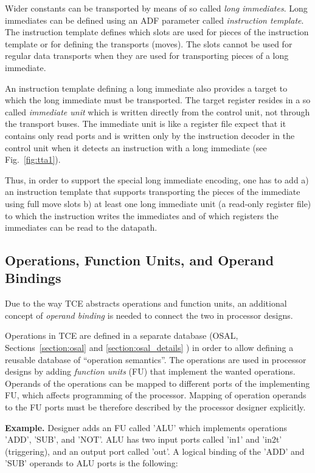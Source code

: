 \documentclass[twoside]{tceusermanual}
\begin{document}
Wider constants can be transported by means of so called \textit{long
  immediates}. Long immediates can be defined using an ADF parameter
called \textit{instruction template}. The instruction template defines
which slots are used for pieces of the instruction template or for
defining the transports (moves).  The slots cannot be used for regular
data transports when they are used for transporting pieces of a long
immediate.

An instruction template defining a long immediate also provides
a target to which the long immediate must be transported. The target register
resides in a so called \textit{immediate unit} which is written directly 
from the control unit, not through the transport buses. The immediate unit is like
a register file expect that it contains only read ports and is written
only by the instruction decoder in the control unit when it detects an 
instruction with a long immediate (see Fig.~\ref{fig:tta1}).

Thus, in order to support the special long immediate encoding, one has
to add a) an instruction template that supports transporting the pieces
of the immediate using full move slots b) at least one long immediate
unit (a read-only register file) to which the instruction writes the
immediates and of which registers the immediates can be read to the
datapath.

\subsection{Operations, Function Units, and Operand Bindings}
Due to the way TCE abstracts operations and function units, an
additional concept of \textit{operand binding} is needed to 
connect the two in processor designs.

Operations in TCE are defined in a separate database (OSAL,
Sections~\ref{section:osal} and \ref{section:osal_details} ) in order
to allow defining a reusable database of ``operation semantics''. The
operations are used in processor designs by adding \textit{function
units} (FU) that implement the wanted operations. Operands of the
operations can be mapped to different ports of the implementing FU,
which affects programming of the processor. Mapping of operation
operands to the FU ports must be therefore described by the processor
designer explicitly.

\textbf{Example.} Designer adds an FU called 'ALU' which implements
operations 'ADD', 'SUB', and 'NOT'. ALU has two input ports called 'in1' and 
'in2t' (triggering), and an output port called 'out'. A logical binding of 
the 'ADD' and 'SUB' operands to ALU ports is the following:
\end{document}
